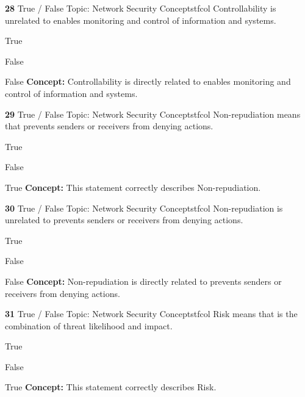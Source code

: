 \documentclass[10pt,a4paper]{article}
\begin{document}
\begin{qcard}{\color{white}\textbf{28} \hfill \small True / False \textbar{} Topic: Network Security Concepts}{tfcol}
Controllability is unrelated to enables monitoring and control of information and systems.

\begin{qoptions}
\item True
\item False
\end{qoptions}
\begin{explainbox}{False}
\textbf{Concept:} Controllability is directly related to enables monitoring and control of information and systems.
\end{explainbox}
\end{qcard}

\begin{qcard}{\color{white}\textbf{29} \hfill \small True / False \textbar{} Topic: Network Security Concepts}{tfcol}
Non-repudiation means that prevents senders or receivers from denying actions.

\begin{qoptions}
\item True
\item False
\end{qoptions}
\begin{explainbox}{True}
\textbf{Concept:} This statement correctly describes Non-repudiation.
\end{explainbox}
\end{qcard}

\begin{qcard}{\color{white}\textbf{30} \hfill \small True / False \textbar{} Topic: Network Security Concepts}{tfcol}
Non-repudiation is unrelated to prevents senders or receivers from denying actions.

\begin{qoptions}
\item True
\item False
\end{qoptions}
\begin{explainbox}{False}
\textbf{Concept:} Non-repudiation is directly related to prevents senders or receivers from denying actions.
\end{explainbox}
\end{qcard}

\begin{qcard}{\color{white}\textbf{31} \hfill \small True / False \textbar{} Topic: Network Security Concepts}{tfcol}
Risk means that is the combination of threat likelihood and impact.

\begin{qoptions}
\item True
\item False
\end{qoptions}
\begin{explainbox}{True}
\textbf{Concept:} This statement correctly describes Risk.
\end{explainbox}
\end{qcard}
\end{document}

